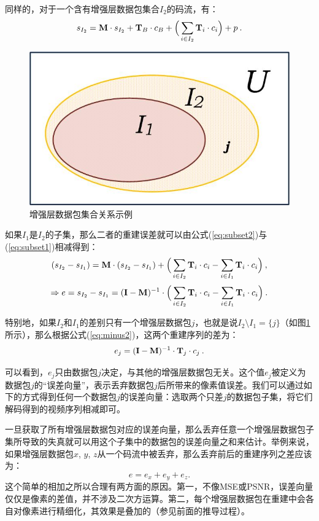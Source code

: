 同样的，对于一个含有增强层数据包集合$I_2$的码流，有：
\begin{equation}
\label{eq:subset2}
s_{I_2} = {\rm\bf M} \cdot s_{I_2} + {\rm\bf T}_{B} \cdot c_{B} + \Big( \sum_{i \in I_2}{\rm\bf T}_i \cdot c_i \Big) + p \: .
\end{equation}

\begin{figure}[t]
	\centering
	\includegraphics[width = 0.5\linewidth]{figures/subset.jpg}
	\caption{增强层数据包集合关系示例 \label{fig:subset}}
\end{figure}

如果$I_1$是$I_2$的子集，那么二者的重建误差就可以由公式(\ref{eq:subset2})与(\ref{eq:subset1})相减得到：
\begin{equation}
\label{eq:minus1}
(s_{I_2} - s_{I_1}) = {\rm\bf M} \cdot (s_{I_2} - s_{I_1}) + \Big( \sum_{i \in I_2}{\rm\bf T}_i \cdot c_i - \sum_{i \in I_1}{\rm\bf T}_i \cdot c_i \Big) \: ,
\end{equation}
\begin{equation}
\label{eq:minus2}
\Rightarrow e = s_{I_2} - s_{I_1} = ({\rm\bf I - M})^{-1} \cdot \Big( \sum_{i \in I_2}{\rm\bf T}_i \cdot c_i - \sum_{i \in I_1}{\rm\bf T}_i \cdot c_i \Big) \: .
\end{equation}

特别地，如果$I_2$和$I_1$的差别只有一个增强层数据包$j$，也就是说$I_2 \setminus I_1 = \{j\}$（如图\ref{fig:subset}所示），那么根据公式(\ref{eq:minus2})，这两个重建序列的差为：
\begin{equation}
\label{eq:error_j}
e_j = ({\rm\bf I - M})^{-1} \cdot {\rm\bf T}_j \cdot c_j \: .
\end{equation}

可以看到，$e_j$只由数据包$j$决定，与其他的增强层数据包无关。这个值$e_j$被定义为数据包$j$的“误差向量”，表示丢弃数据包$j$后所带来的像素值误差。我们可以通过如下的方式得到任何一个数据包$j$的误差向量：选取两个只差$j$的数据包子集，将它们解码得到的视频序列相减即可。

一旦获取了所有增强层数据包对应的误差向量，那么丢弃任意一个增强层数据包子集所导致的失真就可以用这个子集中的数据包的误差向量之和来估计。举例来说，如果增强层数据包$x$, $y$, $z$从一个码流中被丢弃，那么丢弃前后的重建序列之差应该为：
\begin{equation}
e = e_x + e_y + e_z.
\end{equation}
这个简单的相加之所以合理有两方面的原因。第一，不像MSE或PSNR，误差向量仅仅是像素的差值，并不涉及二次方运算。第二，每个增强层数据包在重建中会各自对像素进行精细化，其效果是叠加的（参见前面的推导过程）。

